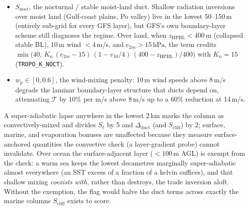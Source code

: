 \documentclass[11pt,a4paper]{article}
\newcommand{\SI}[2]{#1\,\text{#2}}
\begin{document}
\begin{itemize}[nosep]
        reconstruction.  The trade / subsidence
        inversion over the subtropical highs (Azores--Bermuda,
        California--Baja, Canary) is a sharp ${\sim}$100--200\,m
        humidity cliff at 800--1500\,m that GFS's 250--500\,m
        level spacing smears across 3--4 layers, dropping every
        \emph{per-layer} $\mathrm{d}N/\mathrm{d}h$ to the
        $-79$\,N/km super-refractive onset or weaker even when
        the physical inversion ducts hard, the failure mode
        behind a near-zero rank correlation with Hepburn's field
        over the NW Atlantic without this term.  The
        column-integrated vapour-pressure drop survives the
        smearing: with $e_{\text{low}}$ the maximum $e$ in the
        lowest 500\,m and $e_{\text{hi}}$ the minimum up to
        3\,km, the term fires over ocean cells when
        $e_{\text{hi}} < 0.45\,e_{\text{low}}$ (a genuine
        subsidence column, not a moist convective one) and
        credits
        $\min\!\bigl(70,\, K_c\,(e_{\text{low}} - e_{\text{hi}}
        - \SI{8}{hPa})\bigr)$ with $K_c = 5$\,M-units/hPa,
        weighted by the cliff height (1.0 to 2\,km, 0.5 to
        3\,km) and faded out as $\max(0, 1 -
        \Delta_{\text{duct}}/20)$: a profile that already
        resolves a duct needs no reconstruction.
        $K_c$ and the 8\,hPa onset are env-tunable
        (\texttt{TROPO\_K\_CLIFF},
        \texttt{TROPO\_CLIFF\_MIN\_DROP}) for the calibration
        sweeps described below.
  \item $S_{\text{noct}}$, the nocturnal / stable moist-land
        duct.  Shallow radiation inversions over moist
        land (Gulf-coast plains, Po valley) live in the lowest
        50--150\,m (entirely sub-grid for every GFS layer),
        but GFS's own boundary-layer scheme still diagnoses the
        regime.  Over land, when $z_{\text{HPBL}} < 400$\,m
        (collapsed stable BL), 10\,m wind $< 4$\,m/s, and
        $e_{2m} > \SI{15}{hPa}$, the term credits
        $\min\!\bigl(40,\, K_n\,(e_{2m} - 15)\,
        (1 - v_{10}/4)\,(400 - z_{\text{HPBL}})/400\bigr)$
        with $K_n = 15$ (\texttt{TROPO\_K\_NOCT}).
  \item $w_p \in [0, 0.6]$, the wind-mixing penalty: 10\,m wind
        speeds above 8\,m/s degrade the laminar boundary-layer
        structure that ducts depend on, attenuating $\mathcal{T}$
        by 10\% per m/s above 8\,m/s up to a 60\% reduction at
        14\,m/s.
\end{itemize}
A super-adiabatic lapse anywhere in the lowest 2\,km marks the
column as convectively-mixed and divides $S_{\ell}$ by 5 and
$\Delta_{\text{duct}}$ (and $S_{\text{cliff}}$) by 2; surface,
marine, and evaporation bonuses are unaffected because they
measure surface-anchored quantities the convective check (a
layer-gradient probe) cannot invalidate.  Over ocean the
surface-adjacent layer ($< 100$\,m AGL) is exempt from the check:
a warm sea keeps the lowest decametres marginally super-adiabatic
almost everywhere (an SST excess of a fraction of a kelvin
suffices), and that shallow mixing \emph{coexists with}, rather
than destroys, the trade inversion aloft.  Without the
exemption, the flag would halve the duct terms across exactly the
marine columns $S_{\text{cliff}}$ exists to score.
\end{document}
